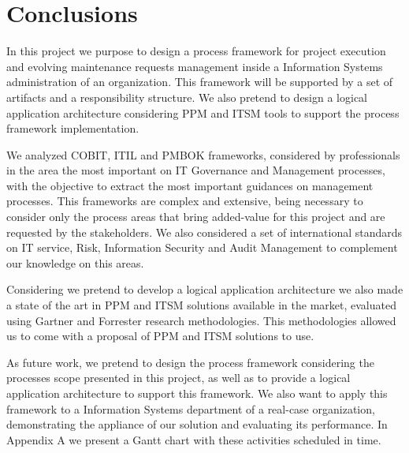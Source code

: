 
% 
% 

\section{Conclusions}

In this project we purpose to design a process framework for project execution and evolving maintenance requests management inside a Information Systems administration of an organization. This framework will be supported by a set of artifacts and a responsibility structure. We also pretend to design a logical application architecture considering PPM and ITSM tools to support the process framework implementation.\par
We analyzed COBIT, ITIL and PMBOK frameworks, considered by professionals in the area the most important on IT Governance and Management processes, with the objective to extract the most important guidances on management processes. This frameworks are complex and extensive, being necessary to consider only the process areas that bring added-value for this project and are requested by the stakeholders. We also considered a set of international standards on IT service, Risk, Information Security and Audit Management to complement our knowledge on this areas.\par
Considering we pretend to develop a logical application architecture we also made a state of the art in PPM and ITSM solutions available in the market, evaluated using Gartner and Forrester research methodologies. This methodologies allowed us to come with a proposal of PPM and ITSM solutions to use.\par
As future work, we pretend to design the process framework considering the processes scope presented in this project, as well as to provide a logical application architecture to support this framework. We also want to apply this framework to a Information Systems department of a real-case organization, demonstrating the appliance of our solution and evaluating its performance. In Appendix A we present a Gantt chart with these activities scheduled in time.\par 
